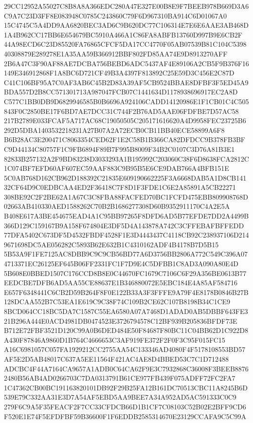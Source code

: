 \documentclass[UTF8,fontset=fandol,zihao=-4,a4paper]{ctexart}
\begin{document}
{{29CC12952A55027C8B8A8A366EDC280A47E327E00B8E9F7BEEB978B669D3A6C9A7C23D3FF8E083948C0785C243860C79F6D967310BA914C6D01067A0
15C4745C5A4DD9AA6820BEC3AD6C9B620DC77C106314E7E6E6AAE3AB468D1A4B962CC17BB6E654679BC5910A466A1C86FA8ABFB13760D997B9E6CB2F
44A98ECD6C23D85520FA76865CFCF5DA17CC4770F05AB07539B81C104C539840308879E289278E1A35AA59B366912BBF802FD85AA74E9D8913270AFF
2B6A47C3F90AF88AE7DCBA756BEBD6ADC5437AF4E89106A2CB5F9B376F16149E346912868F1A8BC6D721CF49B3A4397F813892C25E59D3C456E2C87D
C41C106BF95A7C0AF3AB6C45B2D83A39AF5CB9524BBAE8DFBF3F5ED45A9BDA557D2B8CC571301713A987047FCB07C1441634D1178938696917EC2A8D
C577C1BB0DB9D6829946585B0B6696A924106CADD14120986E1F1CB01C4C505843F0C2850BE17F6BD7AE7DCC31C744F2B76AD5AAE06FDFBE7D57AC58
217B2789E033FCAF5A717AC68C19050505C205171616620A4D9958FEC23725B6292D5DBA1403532218231A27B07A2A72ECB0CB11BB40ECE58899A6F8
B6B28AC3E200471C8063354CED62F1E2C58B1B366CA82DFDCC9B378FB3BFC9D44134C80757F1C9FB6894F89B7F995B8009F34B2C0107C3D76A81B3E1
82833B257132A2F9BD83238D3033293A1B195992C203060C38F6D8638FCA2812C1C074BF7EFD60AF607EC59AAF883C9B95B5E6CE9DAB766A4BFB151E
5C0AB768D162CB962D188392C21835E609190662225F3A6668DAB5A1D8CB14132CF64D9C0EDBCAA4ED2F36418C7F8D1F3FDE1C6E2A85891A5CB22271
308BE92C2F2BE62A1A67C3C8FBA88FACFED70BC1FCFD475EBB809908768D02663AB410330AED1588262C70B2B1686277308D60B9352911170C4A2E5A
B408E617A3BE454675EAD4A1C95BB97265F8DFD6AD5B77EFDE7DD2A4499B366D129C159167B9A158F674804E3DF5D4A143878A742C3CFFEBAFBFFEDD
77DFA5402C673DF5D4532FBDF4528F1E3D4443437C4118CB92C238937106D2149671698DC5AE056282C5893B62E632B1C4310162ADF4B4178B7D5B15
5B53A9F1FE7125AC8DBB9C9C9CB56BD77A6D3756BB2806A772C549C396A074713371EC26125EF645B06FF2331FC1F7D9E4C5DFBB1C8AD3A090A80E4D
5B608E0BBED1507C176CCD8B8E0C44670FC1679C7106C6F29A356BE0613B77EEDCBE7DFB6AD5AA55CE88637E1B346880072E5EBC184E4A85AF584716
E657F6348441C6CB2D59B264F8F0E122B33A3F3FFFE9A79F4E8178B0846B27B128DCAA552B7C53EA1E619C9C38F74C109B2CE62C107B8198B34C1CE9
8BCD064CC18BC5DA7C1587C55EA6580A07A7468D1ADAD0AB5DBBF643FE321B296A444E0ACD4981DB0474523E3726794578C12BF939B205836BFDF73E
B712E72FBF3521D120C99A0B6DED484E50F84687F80BC11C04BB62D1C922D8A430F87846A9860D1B764C4666653C3AF919FE372F2F0F3C95F015FC15
A16C6981057C057FA1929212CC2755AA54C133346AD4080F4F5178108553BD57AF5E2D5AB48017C637A5EE11564F421AC4AE8D4BBED53C7C1D712488
ADCBC4F44A7164CA9657A1ADB0C64CA62F9E3C7932868C36008F3BEEB88762480B56AB4AD0266703C7DA0313791B61CE977FB439F075ADFF72FC2FA7
1C47362CB00BC191163820101DB92F29B25FA12B161DC70513CBC11A8245B6D539E79C332AA31E3D7A54AF5EBD5AA9BEE7A34A952AD5AC591333C0C9
279F6C9A5F35FEACF2F7CC33CFDCB66D1B1CF7C08103C52B02E2BFF9CD6F520E1E74F5EFDFBF59B36600F1F6EDDB2585314670E23129CCAFA9C5C99A
}}
\end{document}
